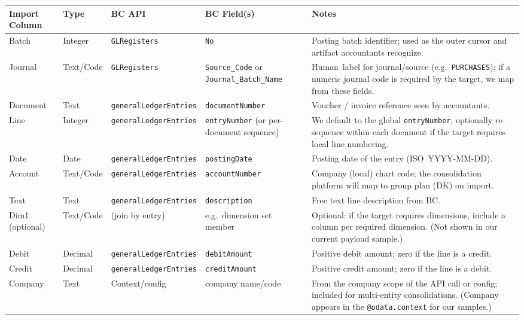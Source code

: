 \documentclass[a4paper,10pt]{article}
\begin{document}
\begin{table}[H]
\centering
\small %
\renewcommand{\arraystretch}{1.1}
\begin{tabularx}{\linewidth}{@{}l l l L{3.2cm} Y@{}}
\toprule
\textbf{Import Column} & \textbf{Type} & \textbf{BC API} & \textbf{BC Field(s)} & \textbf{Notes} \\
\midrule
Batch & Integer & \texttt{GLRegisters} & \texttt{No} & Posting batch identifier; used as the outer cursor and artifact accountants recognize. \\
Journal & Text/Code & \texttt{GLRegisters} & \texttt{Source\_Code} or \texttt{Journal\_Batch\_Name} & Human~label for journal/source (e.g.\ \texttt{PURCHASES}); if a numeric journal code is required by the target, we map from these fields. \\
Document & Text & \texttt{generalLedgerEntries} & \texttt{documentNumber} & Voucher / invoice reference seen by accountants. \\
Line & Integer & \texttt{generalLedgerEntries} & \texttt{entryNumber} (or per-document sequence) & We default to the global \texttt{entryNumber}; optionally re-sequence within each document if the target requires local line numbering. \\
Date & Date & \texttt{generalLedgerEntries} & \texttt{postingDate} & Posting date of the entry (ISO~YYYY-MM-DD). \\
Account & Text/Code & \texttt{generalLedgerEntries} & \texttt{accountNumber} & Company (local) chart code; the consolidation platform will map to group plan (DK) on import. \\
Text & Text & \texttt{generalLedgerEntries} & \texttt{description} & Free text line description from BC. \\
Dim1 (optional) & Text/Code & (join by entry) & e.g.\ dimension set member & Optional: if the target requires dimensions, include a column per required dimension. (Not shown in our current payload sample.) \\
Debit & Decimal & \texttt{generalLedgerEntries} & \texttt{debitAmount} & Positive debit amount; zero if the line is a credit. \\
Credit & Decimal & \texttt{generalLedgerEntries} & \texttt{creditAmount} & Positive credit amount; zero if the line is a debit. \\
Company & Text & Context/config & company name/code & From the company scope of the API call or config; included for multi-entity consolidations. (Company appears in the \texttt{@odata.context} for our samples.) \\
\bottomrule
\end{tabularx}
\end{table}
\end{document}
